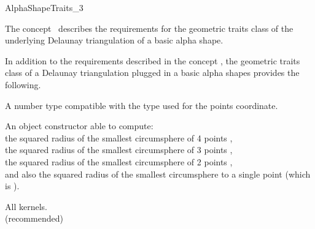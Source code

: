 \begin{ccRefConcept} {AlphaShapeTraits_3}


\ccDefinition
The concept \ccRefName\ describes the requirements 
for the geometric traits class
of  the underlying  Delaunay triangulation of a basic alpha shape.



\ccRefines
{}

In addition to the requirements described in the concept 
,
the geometric traits class of a
Delaunay triangulation plugged in a basic alpha shapes
provides the following.


\ccTypes

 {A number type compatible with the type used for
  the points coordinate.}

{An object constructor able to compute: \\
the squared radius of the
 smallest circumsphere  of  4 points ,\\
the squared radius of the
smallest circumsphere of  3 points ,\\
the squared radius of the smallest  circumsphere
of 2 points , \\
and also the squared radius of the smallest circumsphere
to a single point  (which is ).} 


\ccCreation
{}
\ccThreeToTwo



\ccAccessFunctions
{} {}

\ccHasModels
All  kernels.\\
 (recommended)\\
\\
\\
\\
\\
\\


\end{ccRefConcept}
